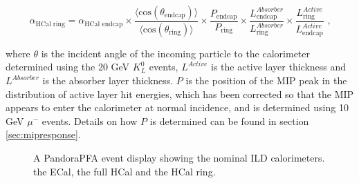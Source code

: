 \begin{equation}
\alpha_{\text{HCal ring}} = \alpha_{\text{HCal endcap}} \times \frac{\langle \text{cos}(\theta_\text{endcap}) \rangle}{\langle \text{cos}(\theta_\text{ring}) \rangle} \times \frac{P_\text{endcap} }{P_\text{ring} } \times \frac{L^{Absorber}_\text{endcap}}{L^{Absorber}_\text{ring} } \times \frac{L^{Active}_\text{ring}}{L^{Active}_\text{endcap}} \text{ ,}
\end{equation}

\noindent where $\theta$ is the incident angle of the incoming particle to the calorimeter determined using the 20 GeV $K^{0}_{L}$ events, $L^{Active}$ is the active layer thickness and $L^{Absorber}$ is the absorber layer thickness. $P$ is the position of the MIP peak in the distribution of active layer hit energies, which has been corrected so that the MIP appears to enter the calorimeter at normal incidence, and is determined using 10 GeV $\mu^{-}$ events.  Details on how $P$ is determined can be found in section \ref{sec:mipresponse}.

\begin{figure}[h!]
\caption[A PandoraPFA event display showing the nominal ILD calorimeters.  \protect{} the ECal, \protect{} the full HCal and \protect{} the HCal ring.]{A PandoraPFA event display showing the nominal ILD calorimeters.  \protect{} the ECal, \protect{} the full HCal and \protect{} the HCal ring.}
\label{fig:calorimeters}
\end{figure}

